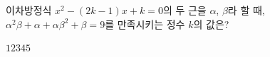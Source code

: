 이차방정식 $x^2-(2k-1)x+k=0$의 두 근을 $\alpha$, $\beta$라 할 때, $\alpha^2\beta+\alpha+\alpha\beta^2+\beta=9$를 만족시키는 정수 $k$의 값은?
\begin{choices32}{$1$}{$2$}{$3$}{$4$}{$5$}\end{choices32}
